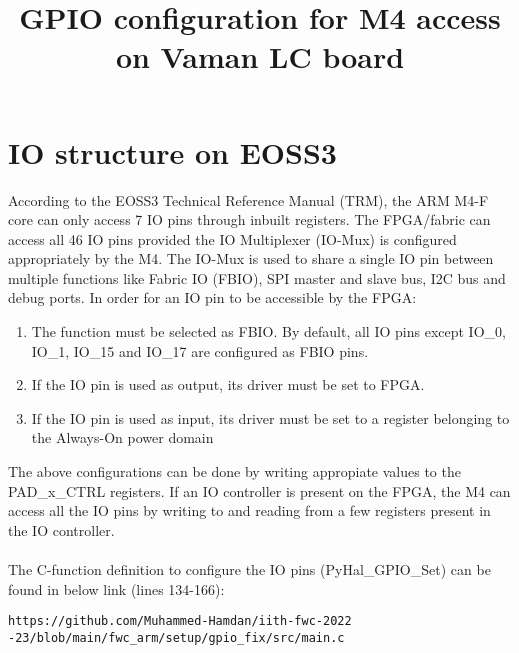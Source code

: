 \documentclass[journal,10pt,twocolumn]{article}
\title{\textbf{GPIO configuration for M4 access on Vaman LC board}}
\begin{document}
\maketitle

\section{\large IO structure on EOSS3}
According to the EOSS3 Technical Reference Manual (TRM), the ARM M4-F core can only access 7 IO pins through inbuilt registers. The FPGA/fabric can access all 46 IO pins provided the IO Multiplexer (IO-Mux) is configured appropriately by the M4. The IO-Mux is used to share a single IO pin between multiple functions like Fabric IO (FBIO), SPI master and slave bus, I2C bus and debug ports. In order for an IO pin to be accessible by the FPGA:
\begin{enumerate}
	\item The function must be selected as FBIO. By default, all IO pins except IO\_0, IO\_1, IO\_15 and IO\_17 are configured as FBIO pins.
	\item If the IO pin is used as output, its driver must be set to FPGA.
	\item If the IO pin is used as input, its driver must be set to a register belonging to the Always-On power domain
\end{enumerate}
The above configurations can be done by writing appropiate values to the PAD\_x\_CTRL registers. If an IO controller is present on the FPGA, the M4 can access all the IO pins by writing to and reading from a few registers present in the IO controller. \\\\
The C-function definition to configure the IO pins (PyHal\_GPIO\_Set) can be found in below link (lines 134-166):
\begin{verbatim}
https://github.com/Muhammed-Hamdan/iith-fwc-2022
-23/blob/main/fwc_arm/setup/gpio_fix/src/main.c
\end{verbatim}
\end{document}

